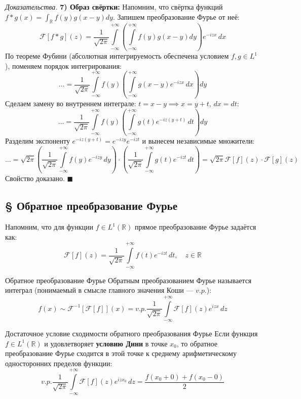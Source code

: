\documentclass[12pt,a4paper]{article}
\newenvironment{Proof}[1][Доказательство]{\vspace{0.5em}\noindent\textit{#1.}\hspace{0.5em}\ignorespaces}{\hfill$\blacksquare$\vspace{1em}}
\begin{document}
\begin{Proof}[Доказательства]
\textbf{7) Образ свёртки:} Напомним, что свёртка функций $f * g(x) = \int_{\mathbb{R}} f(y)g(x-y) dy$. Запишем преобразование Фурье от неё:
$$ \mathcal{F}[f*g](z) = \frac{1}{\sqrt{2\pi}} \int\limits_{-\infty}^{+\infty} \left( \int\limits_{-\infty}^{+\infty} f(y)g(x-y) dy \right) e^{-izx} \, dx $$
По теореме Фубини (абсолютная интегрируемость обеспечена условием $f,g \in L^1$), поменяем порядок интегрирования:
$$ \dots = \frac{1}{\sqrt{2\pi}} \int\limits_{-\infty}^{+\infty} f(y) \left( \int\limits_{-\infty}^{+\infty} g(x-y) e^{-izx} \, dx \right) dy $$
Сделаем замену во внутреннем интеграле: $t = x - y \implies x = y + t$, $dx = dt$:
$$ \dots = \frac{1}{\sqrt{2\pi}} \int\limits_{-\infty}^{+\infty} f(y) \left( \int\limits_{-\infty}^{+\infty} g(t) e^{-iz(y+t)} \, dt \right) dy $$
Разделим экспоненту $e^{-iz(y+t)} = e^{-izy} e^{-izt}$ и вынесем независимые множители:
$$ \dots = \sqrt{2\pi} \left( \frac{1}{\sqrt{2\pi}} \int\limits_{-\infty}^{+\infty} f(y) e^{-izy} \, dy \right) \cdot \left( \frac{1}{\sqrt{2\pi}} \int\limits_{-\infty}^{+\infty} g(t) e^{-izt} \, dt \right) = \sqrt{2\pi} \mathcal{F}[f](z) \cdot \mathcal{F}[g](z) $$
Свойство доказано.
\end{Proof}


\subsection{§ Обратное преобразование Фурье}

Напомним, что для функции $f \in L^1(\mathbb{R})$ прямое преобразование Фурье задаётся как:
$$ \mathcal{F}[f](z) = \frac{1}{\sqrt{2\pi}} \int\limits_{-\infty}^{+\infty} f(t) e^{-i z t} \, dt, \quad z \in \mathbb{R} $$

\begin{Definition}{Обратное преобразование Фурье}{}
Обратным преобразованием Фурье называется интеграл (понимаемый в смысле главного значения Коши — $v.p.$):
$$ f(x) \sim \mathcal{F}^{-1}[\mathcal{F}[f]](x) = v.p. \frac{1}{\sqrt{2\pi}} \int\limits_{-\infty}^{+\infty} \mathcal{F}[f](z) e^{i z x} \, dz $$
\end{Definition}

\begin{Theorem}{Достаточное условие сходимости обратного преобразования Фурье}{}
Если функция $f \in L^1(\mathbb{R})$ и удовлетворяет \textbf{условию Дини} в точке $x_0$, то обратное преобразование Фурье сходится в этой точке к среднему арифметическому односторонних пределов функции:
$$ v.p. \frac{1}{\sqrt{2\pi}} \int\limits_{-\infty}^{+\infty} \mathcal{F}[f](z) e^{i z x_0} \, dz = \frac{f(x_0+0) + f(x_0-0)}{2} $$
\end{Theorem}
\end{document}
